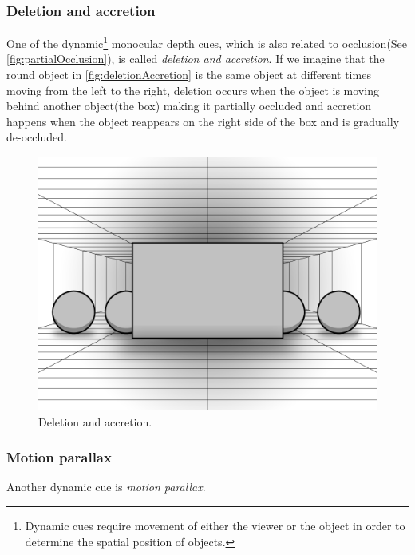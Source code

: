\subsubsection{Deletion and accretion}
One of the dynamic\footnote{Dynamic cues require movement of either the viewer or the object in order to determine the spatial position of objects\citep{sensationPerception}.} monocular depth cues, which is also related to occlusion(See \autoref{fig:partialOcclusion}), is called \textit{deletion and accretion}. If we imagine that the round object in \autoref{fig:deletionAccretion} is the same object at different times moving from the left to the right, deletion occurs when the object is moving behind another object(the box) making it partially occluded and accretion happens when the object reappears on the right side of the box and is gradually de-occluded\citep{sensationPerception}.
\begin{figure}[H]
	\centering
	\includegraphics[width=0.8\linewidth]{figure/Analysis/deletionAccretion.png}
	\caption{Deletion and accretion.}
	\label{fig:deletionAccretion}
\end{figure}

\subsubsection{Motion parallax}
Another dynamic cue is \textit{motion parallax}. 

